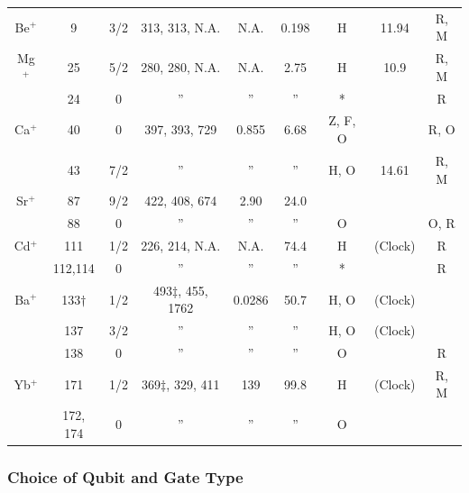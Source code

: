 \documentclass[%
reprint,
 amsmath,amssymb,
]{revtex4-1}
\begin{document}
\begin{table}[t b h !]
\begin{ruledtabular}
\begin{tabular}{ccccccccc}
\rule{0pt}{4ex}Be$^{+}$ &  9  & 3/2 &  313, 313, N.A.  & N.A. & 0.198  &  H  &  11.94 & R, M\\
\rule{0pt}{4ex}Mg$^{+}$ &  25   & 5/2 &  280, 280, N.A.  & N.A. & 2.75  &  H  &  10.9  & R, M\\
         &  24   &  0 & '' &  '' & ''  &  *  &   & R\\
\rule{0pt}{4ex}Ca$^{+}$ &  40   & 0 &  397, 393, 729  & 0.855 & 6.68  &  Z, F, O  &   & R, O\\
         &  43   & 7/2 & ''  & '' &  ''  &  H, O  &  14.61 &  R, M\\
\rule{0pt}{4ex}Sr$^{+}$ &  87 & 9/2 &  422, 408, 674  & 2.90  & 24.0  &   &  & \\
         &  88   &  0 & '' & '' & ''  &  O  &   &  O, R\\
\rule{0pt}{4ex}Cd$^{+}$ &  111  & 1/2 &  226, 214, N.A.  & N.A.  & 74.4  &  H  & (Clock) & R \\
         &  112,114  & 0 & ''  & '' & ''   &   *   &  & R \\
\rule{0pt}{4ex}Ba$^{+}$ &  133$\dagger$ & 1/2 &  493$\ddagger$, 455, 1762  & 0.0286 & 50.7  &  H, O  &  (Clock) &  \\
         &  137  &  3/2 & '' & '' & '' &  H, O  &  (Clock) & \\
         &  138  &  0 & ''  & ''  & '' & O  &   & R\\
\rule{0pt}{4ex}Yb$^{+}$ &  171  & 1/2 & 369$\ddagger$, 329, 411  & 139 & 99.8  &  H  &  (Clock) & R, M\\
         &  172, 174  & 0 & '' & '' & '' & O  &   & \\

\end{tabular}
\end{ruledtabular}

\label{tab:ion_props}
\end{table}

\subsubsection{Choice of Qubit and Gate Type}
\end{document}
